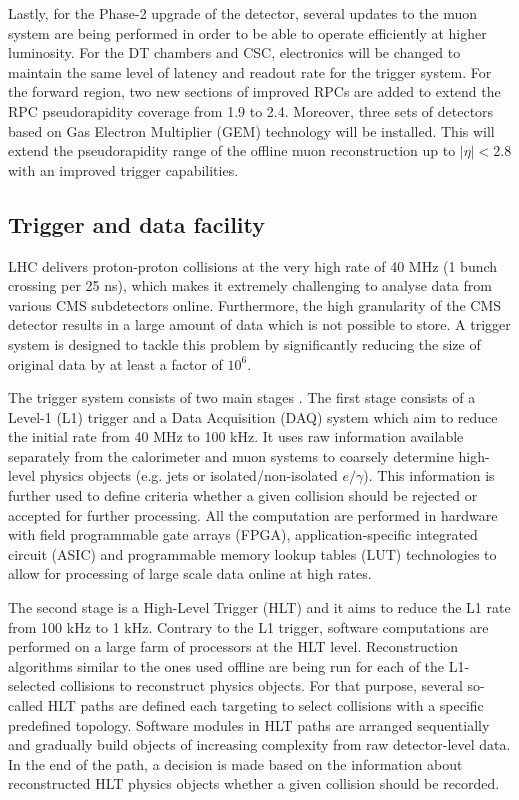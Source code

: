 Lastly, for the Phase-2 upgrade of the detector, several updates to the muon system are being performed \cite{Hebbeker:2017bix} in order to be able to operate efficiently at higher luminosity. For the DT chambers and CSC, electronics will be changed to maintain the same level of latency and readout rate for the trigger system. For the forward region, two new sections of improved RPCs are added to extend the RPC pseudorapidity coverage from 1.9 to 2.4. Moreover, three sets of detectors based on Gas Electron Multiplier (GEM) technology will be installed. This will extend the pseudorapidity range of the offline muon reconstruction up to $|\eta| < 2.8$ with an improved trigger capabilities.

\subsection{Trigger and data facility}\label{sec:trigger}

LHC delivers proton-proton collisions at the very high rate of 40 MHz (1 bunch crossing per 25 ns), which makes it extremely challenging to analyse data  from various CMS subdetectors online. Furthermore, the high granularity of the CMS detector results in a large amount of data which is not possible to store. A trigger system is designed to tackle this problem by significantly reducing the size of original data by at least a factor of $10^6$.

The trigger system consists of two main stages \cite{CMS:2016ngn}. The first stage consists of a Level-1 (L1) trigger and a Data Acquisition (DAQ) system which aim to reduce the initial rate from 40 MHz to 100 kHz. It uses raw information available separately from the calorimeter and muon systems to coarsely determine high-level physics objects (e.g. jets or isolated/non-isolated $e/\gamma$). This information is further used to define criteria whether a given collision should be rejected or accepted for further processing. All the computation are performed in hardware with field programmable gate arrays (FPGA), application-specific integrated circuit (ASIC) and programmable memory lookup tables (LUT) technologies to allow for processing of large scale data online at high rates.

The second stage is a High-Level Trigger (HLT) and it aims to reduce the L1 rate from 100 kHz to 1 kHz. Contrary to the L1 trigger, software computations are performed on a large farm of processors at the HLT level. Reconstruction algorithms similar to the ones used offline are being run for each of the L1-selected collisions to reconstruct physics objects. For that purpose, several so-called HLT paths are defined each targeting to select collisions with a specific predefined topology. Software modules in HLT paths are arranged sequentially and gradually build objects of increasing complexity from raw detector-level data. In the end of the path, a decision is made based on the information about reconstructed HLT physics objects whether a given collision should be recorded.

